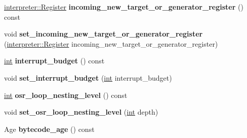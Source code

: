 \begin{DoxyCompactItemize}
\item 
\mbox{\label{classv8_1_1internal_1_1BytecodeArray_a1eaa08df37ce5c77f214636bd2e1f364}} 
\mbox{\hyperlink{classv8_1_1internal_1_1interpreter_1_1Register}{interpreter\+::\+Register}} {\bfseries incoming\+\_\+new\+\_\+target\+\_\+or\+\_\+generator\+\_\+register} () const
\item 
\mbox{\label{classv8_1_1internal_1_1BytecodeArray_a9b2c55eb24cfc3a4de2bcedd47c62662}} 
void {\bfseries set\+\_\+incoming\+\_\+new\+\_\+target\+\_\+or\+\_\+generator\+\_\+register} (\mbox{\hyperlink{classv8_1_1internal_1_1interpreter_1_1Register}{interpreter\+::\+Register}} incoming\+\_\+new\+\_\+target\+\_\+or\+\_\+generator\+\_\+register)
\item 
\mbox{\label{classv8_1_1internal_1_1BytecodeArray_aca467ad8c3072179af60ad687c531108}} 
\mbox{\hyperlink{classint}{int}} {\bfseries interrupt\+\_\+budget} () const
\item 
\mbox{\label{classv8_1_1internal_1_1BytecodeArray_a72a167803c49b95918248f228c95c56a}} 
void {\bfseries set\+\_\+interrupt\+\_\+budget} (\mbox{\hyperlink{classint}{int}} interrupt\+\_\+budget)
\item 
\mbox{\label{classv8_1_1internal_1_1BytecodeArray_ac001f09b7ce7ffdd6168bf2f0bf3ee4e}} 
\mbox{\hyperlink{classint}{int}} {\bfseries osr\+\_\+loop\+\_\+nesting\+\_\+level} () const
\item 
\mbox{\label{classv8_1_1internal_1_1BytecodeArray_a4ea74cb001e79ab5566ee6c30f493d79}} 
void {\bfseries set\+\_\+osr\+\_\+loop\+\_\+nesting\+\_\+level} (\mbox{\hyperlink{classint}{int}} depth)
\item 
\mbox{\label{classv8_1_1internal_1_1BytecodeArray_aada0f0f99ccdb3c2c6e0196c0d9d657e}} 
Age {\bfseries bytecode\+\_\+age} () const
\item 
\mbox{\label{classv8_1_1internal_1_1BytecodeArray_afe7bf17ab5466e841ce539b00b7fed2f}} 

\end{DoxyCompactItemize}
